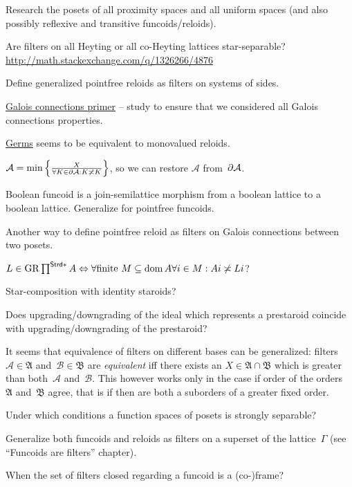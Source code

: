 \documentclass{amsart}
\begin{document}
Research the posets of all proximity spaces and all uniform spaces (and also possibly reflexive and transitive funcoids/reloids).

Are filters on all Heyting or all co-Heyting lattices star-separable?
\url{http://math.stackexchange.com/q/1326266/4876}

Define generalized pointfree reloids as filters on systems of sides.

\href{https://www.math.ksu.edu/~strecker/primer.ps}{Galois connections primer} -- study to ensure that we considered all Galois connections properties.

\href{https://en.wikipedia.org/wiki/Germ (mathematics)}{Germs} seems to be equivalent to monovalued reloids.

$\mathcal{A} = \min\left\{ \frac{X}{\forall K\in\partial\mathcal{A}:K\not\asymp K}\right\}$, so we can restore $\mathcal{A}$ from~$\partial\mathcal{A}$.

Boolean funcoid is a join-semilattice morphism from a boolean lattice to a boolean lattice. Generalize for pointfree funcoids.

Another way to define pointfree reloid as filters on Galois connections between two posets.

$L \in \operatorname{GR} \prod^{\mathsf{Strd} \ast} A \Leftrightarrow \forall
\text{finite } M \subseteq \operatorname{dom} A \forall i \in M : A i \not\asymp L i$?

Star-composition with identity staroids?

Does upgrading/downgrading of the ideal which represents a prestaroid coincide with upgrading/downgrading of the prestaroid?

It seems that equivalence of filters on different bases can be generalized:
filters~$\mathcal{A}\in\mathfrak{A}$ and~$\mathcal{B}\in\mathfrak{B}$ are \emph{equivalent} iff
there exists an $X\in\mathfrak{A}\cap\mathfrak{B}$ which is greater than both~$\mathcal{A}$ and~$\mathcal{B}$.
This however works only in the case if order of the orders~$\mathfrak{A}$ and~$\mathfrak{B}$ agree,
that is if then are both a suborders of a greater fixed order.

Under which conditions a function spaces of posets is strongly separable?

Generalize both funcoids and reloids as filters on a superset of the lattice~$\Gamma$ (see ``Funcoids are filters'' chapter).

When the set of filters closed regarding a funcoid is a (co-)frame?
\end{document}
